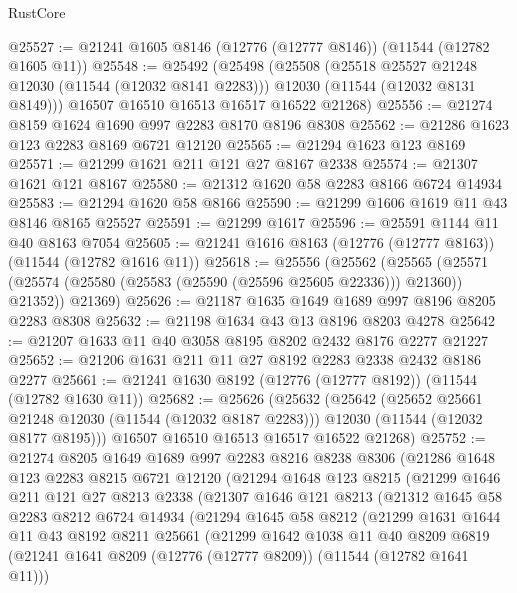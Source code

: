 \begin{lexlean}{RustCore}
\begin{coremodule}
@25527 := @21241 @1605 @8146 (@12776 (@12777 @8146)) (@11544 (@12782 @1605 @11))
@25548 := @25492
    (@25498
      (@25508
        (@25518 @25527 @21248 @12030 (@11544 (@12032 @8141 @2283)))
        @12030
        (@11544 (@12032 @8131 @8149)))
      @16507
      @16510
      @16513
      @16517
      @16522
      @21268)
@25556 := @21274 @8159 @1624 @1690 @997 @2283 @8170 @8196 @8308
@25562 := @21286 @1623 @123 @2283 @8169 @6721 @12120
@25565 := @21294 @1623 @123 @8169
@25571 := @21299 @1621 @211 @121 @27 @8167 @2338
@25574 := @21307 @1621 @121 @8167
@25580 := @21312 @1620 @58 @2283 @8166 @6724 @14934
@25583 := @21294 @1620 @58 @8166
@25590 := @21299 @1606 @1619 @11 @43 @8146 @8165 @25527
@25591 := @21299 @1617
@25596 := @25591 @1144 @11 @40 @8163 @7054
@25605 := @21241 @1616 @8163 (@12776 (@12777 @8163)) (@11544 (@12782 @1616 @11))
@25618 := @25556
    (@25562
      (@25565 (@25571 (@25574 (@25580 (@25583 (@25590 (@25596 @25605 @22336))) @21360)) @21352))
      @21369)
@25626 := @21187 @1635 @1649 @1689 @997 @8196 @8205 @2283 @8308
@25632 := @21198 @1634 @43 @13 @8196 @8203 @4278
@25642 := @21207 @1633 @11 @40 @3058 @8195 @8202 @2432 @8176 @2277 @21227
@25652 := @21206 @1631 @211 @11 @27 @8192 @2283 @2338 @2432 @8186 @2277
@25661 := @21241 @1630 @8192 (@12776 (@12777 @8192)) (@11544 (@12782 @1630 @11))
@25682 := @25626
    (@25632
      (@25642
        (@25652 @25661 @21248 @12030 (@11544 (@12032 @8187 @2283)))
        @12030
        (@11544 (@12032 @8177 @8195)))
      @16507
      @16510
      @16513
      @16517
      @16522
      @21268)
@25752 := @21274
    @8205
    @1649
    @1689
    @997
    @2283
    @8216
    @8238
    @8306
    (@21286
      @1648
      @123
      @2283
      @8215
      @6721
      @12120
      (@21294
        @1648
        @123
        @8215
        (@21299
          @1646
          @211
          @121
          @27
          @8213
          @2338
          (@21307
            @1646
            @121
            @8213
            (@21312
              @1645
              @58
              @2283
              @8212
              @6724
              @14934
              (@21294
                @1645
                @58
                @8212
                (@21299
                  @1631
                  @1644
                  @11
                  @43
                  @8192
                  @8211
                  @25661
                  (@21299
                    @1642
                    @1038
                    @11
                    @40
                    @8209
                    @6819
                    (@21241 @1641 @8209 (@12776 (@12777 @8209)) (@11544 (@12782 @1641 @11)))

\end{coremodule}
\end{lexlean}
